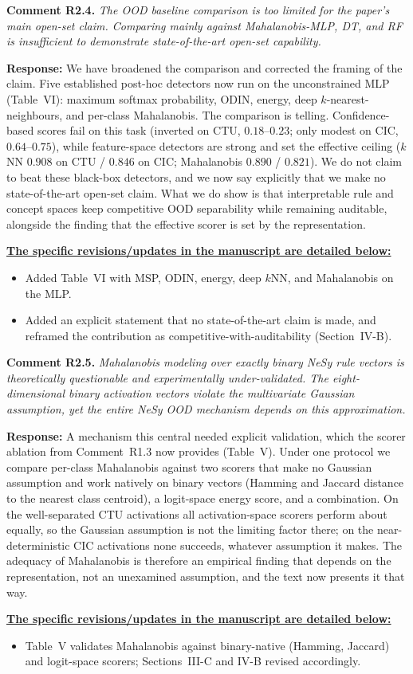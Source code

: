 \documentclass[11pt]{article}
\newcommand{\cmt}[2]{\medskip\noindent\textbf{Comment #1.} \textit{#2}\par}
\newcommand{\resp}{\smallskip\par\noindent\textbf{Response:} }
\newcommand{\revs}{\smallskip\par\noindent\underline{\textbf{The specific revisions/updates in the manuscript are detailed below:}}\par}
\begin{document}
\cmt{R2.4}{The OOD baseline comparison is too limited for the paper's main
open-set claim. Comparing mainly against Mahalanobis-MLP, DT, and RF is
insufficient to demonstrate state-of-the-art open-set capability.}
\resp We have broadened the comparison and corrected the framing of the claim. Five
established post-hoc detectors now run on the unconstrained MLP (Table~VI): maximum
softmax probability, ODIN, energy, deep $k$-nearest-neighbours, and per-class
Mahalanobis. The comparison is telling. Confidence-based scores fail on this task
(inverted on CTU, $0.18$--$0.23$; only modest on CIC, $0.64$--$0.75$), while
feature-space detectors are strong and set the effective ceiling ($k$NN $0.908$ on
CTU / $0.846$ on CIC; Mahalanobis $0.890$ / $0.821$). We do not claim to beat these
black-box detectors, and we now say explicitly that we make no state-of-the-art
open-set claim. What we do show is that interpretable rule and concept spaces keep
competitive OOD separability while remaining auditable, alongside the finding that
the effective scorer is set by the representation.
\revs
\begin{itemize}
  \item Added Table~VI with MSP, ODIN, energy, deep $k$NN, and Mahalanobis on the
  MLP.
  \item Added an explicit statement that no state-of-the-art claim is made, and
  reframed the contribution as competitive-with-auditability (Section~IV-B).
\end{itemize}

\cmt{R2.5}{Mahalanobis modeling over exactly binary NeSy rule vectors is
theoretically questionable and experimentally under-validated. The
eight-dimensional binary activation vectors violate the multivariate Gaussian
assumption, yet the entire NeSy OOD mechanism depends on this approximation.}
\resp A mechanism this central needed explicit validation, which the scorer
ablation from Comment~R1.3 now provides (Table~V). Under one protocol we compare
per-class Mahalanobis against two scorers that make no Gaussian assumption and
work natively on binary vectors (Hamming and Jaccard distance to the nearest class
centroid), a logit-space energy score, and a combination. On the well-separated
CTU activations all activation-space scorers perform about equally, so the Gaussian
assumption is not the limiting factor there; on the near-deterministic CIC
activations none succeeds, whatever assumption it makes. The adequacy of
Mahalanobis is therefore an empirical finding that depends on the representation,
not an unexamined assumption, and the text now presents it that way.
\revs
\begin{itemize}
  \item Table~V validates Mahalanobis against binary-native (Hamming, Jaccard) and
  logit-space scorers; Sections~III-C and IV-B revised accordingly.
\end{itemize}
\end{document}
